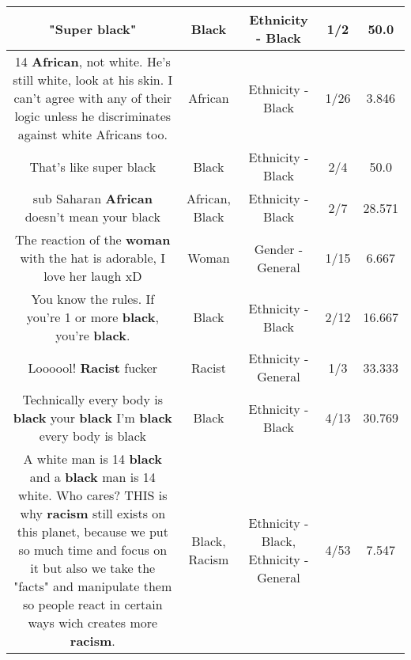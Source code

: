 \documentclass[11pt]{article}
\newlength\mylength
\begin{document}
\begin{center}
\begin{longtable}{|C{.65\mylength}|C{.30\mylength}|C{.12\mylength}|C{.12\mylength}|C{.12\mylength}|}
  \small "Super \textbf{black}"\normalsize   & Black & Ethnicity - Black & 1/2 & 50.0 \\  \hline
  \small 14 \textbf{African}, not white. He's still white, look at his skin. I can't agree with any of their logic unless he discriminates against white Africans too.\normalsize   & African & Ethnicity - Black & 1/26 & 3.846 \\  \hline
  \small That's like super black\normalsize   & Black & Ethnicity - Black & 2/4 & 50.0 \\  \hline
  \small sub Saharan \textbf{African} doesn't mean your black\normalsize   & African, Black & Ethnicity - Black & 2/7 & 28.571 \\  \hline
  \small The reaction of the \textbf{woman} with the hat is adorable, I love her laugh xD\normalsize   & Woman & Gender - General & 1/15 & 6.667 \\  \hline
  \small You know the rules. If you're 1 or more \textbf{black}, you're \textbf{black}.\normalsize   & Black & Ethnicity - Black & 2/12 & 16.667 \\  \hline
  \small Loooool! \textbf{Racist} fucker\normalsize   & Racist & Ethnicity - General & 1/3 & 33.333 \\  \hline
  \small Technically every body is \textbf{black} your \textbf{black} I'm \textbf{black} every body is black\normalsize   & Black & Ethnicity - Black & 4/13 & 30.769 \\  \hline
  \small A white man is 14 \textbf{black} and a \textbf{black} man is 14 white. Who cares? THIS is why \textbf{racism} still exists on this planet, because we put so much time and focus on it but also we take the "facts" and manipulate them so people react in certain ways wich creates more \textbf{racism}.\normalsize   & Black, Racism & Ethnicity - Black, Ethnicity - General & 4/53 & 7.547 \\  \hline

\end{longtable}
\end{center}
\end{document}
